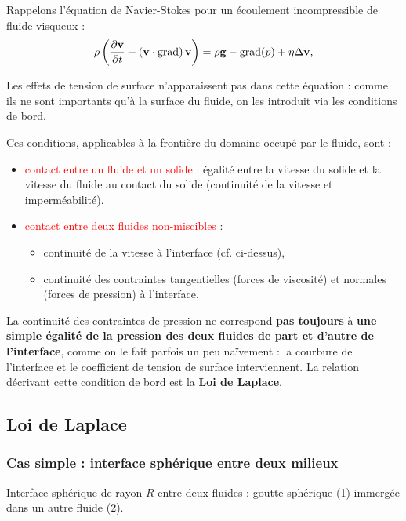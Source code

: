 \documentclass[11pt,a4paper]{report}
\begin{document}
Rappelons l'équation de Navier-Stokes pour un écoulement incompressible de fluide visqueux :
	\begin{equation}
		\rho\left(\frac{\partial\bold{v}}{\partial t}+\left(\bold{v}\cdot\bold{\text{grad}}\right)\bold{v}\right)=\rho\bold{g}-\bold{\text{grad}}(p)+\eta\Delta\bold{v},
	\end{equation}	

Les effets de tension de surface n'apparaissent pas dans cette équation : comme ils ne sont importants qu'à la surface du fluide, on les introduit via les conditions de bord.

Ces conditions, applicables à la frontière du domaine occupé par le fluide, sont :
\begin{itemize}
	\item \textcolor{red}{contact entre un fluide et un solide} : égalité entre la vitesse du solide et la vitesse du fluide au contact du solide (continuité de la vitesse et imperméabilité).
	
	\item \textcolor{red}{contact entre deux fluides non-miscibles} :
		\begin{itemize}
			\item continuité de la vitesse à l'interface (cf. ci-dessus),
			\item continuité des contraintes tangentielles (forces de viscosité) et normales (forces de pression) à l'interface.
		\end{itemize}
\end{itemize}

La continuité des contraintes de pression ne correspond \textbf{pas toujours} à \textbf{une simple égalité de la pression des deux fluides de part et d'autre de l'interface}, comme on le fait parfois un peu naïvement : la courbure de l'interface et le coefficient de tension de surface interviennent. La relation décrivant cette condition de bord est la \textbf{Loi de Laplace}.

\subsection{Loi de Laplace}

\subsubsection{Cas simple : interface sphérique entre deux milieux}

Interface sphérique de rayon $R$ entre deux fluides : goutte sphérique (1) immergée dans un autre fluide (2).
\end{document}
